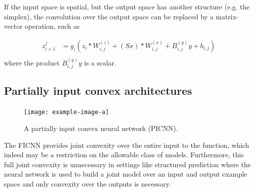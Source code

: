 If the input space is spatial, but the output space has another structure
(e.g. the simplex), the convolution over the output space can
be replaced by a matrix-vector operation, such as

\begin{equation}
\begin{split}
z_{i+1}^j & = g_i\left(z_i\ast W_{i,j}^{(z)} + (Sx)\ast W_{i,j}^{(x)} + B_{i,j}^{(y)}y + b_{i,j} \right) \\
\end{split}
\end{equation}
where the product $B_{i,j}^{(y)}y$ is a scalar.


\subsection{Partially input convex architectures}\label{sec:icnn:picnn}
\begin{figure}[t]
  \centering
    \texttt{[image: example-image-a]}
  \caption{A partially input convex neural network (PICNN).}
  \label{fig:picnn}
\end{figure}
The FICNN provides joint convexity over the entire input to the function, which
indeed may
be a restriction on the allowable class of models.  Furthermore, this full joint
convexity is unnecessary in settings like structured prediction where the neural
network is used to build a joint model over an input and output example space
and only convexity over the outputs is necessary.

